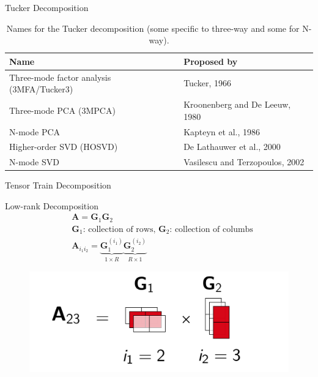 \documentclass[t, 10pt, handout, aspectratio=169]{beamer}
\begin{document}
\begin{frame}{Tucker Decomposition}
\large
\begin{table}
\begin{tabular}{l | l}
Name & Proposed by \\
\hline \hline
Three-mode factor analysis (3MFA/Tucker3) & Tucker, 1966 \\ 
Three-mode PCA (3MPCA) &  Kroonenberg and De Leeuw, 1980\\
N-mode PCA & Kapteyn et al., 1986 \\
Higher-order SVD (HOSVD)  & De Lathauwer et al., 2000 \\
N-mode SVD & Vasilescu and Terzopoulos, 2002
\end{tabular}
\caption{Names for the Tucker decomposition (some specific to three-way and some for N-way).}
\end{table}
\end{frame}

\begin{frame}{Tensor Train Decomposition}
\large
\begin{block}{Low-rank Decomposition}
$$
\begin{aligned}
&\mathbf{A}=\mathbf{G}_{1}\mathbf{G}_{2}  \\
&\mathbf{G}_{1}\text{: collection of rows, }\mathbf{G}_{2}\text{: collection of columbs}\\
&\mathbf{A}_{i_1i_2}=\underbrace{\mathbf{G}_1^{(i_1)}}_{1\times R}\underbrace{\mathbf{G}_2^{(i_2)}}_{R\times 1}
\end{aligned}
$$
\end{block}
\begin{figure}
	\centering  
	\includegraphics[width=0.45\linewidth]{figs/tt_lowrank.png}
	\label{fig:tt_lowrank}
\end{figure}
\end{frame}
\end{document}
